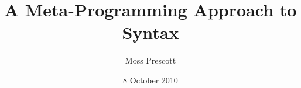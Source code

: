 \documentclass[12pt]{amsart}
\title{A Meta-Programming Approach to Syntax}
\author{Moss Prescott}
\date{8 October 2010}
\begin{document}
\begin{abstract}

\end{abstract}

\maketitle


\newpage
\tableofcontents

\newpage





\end{document}
